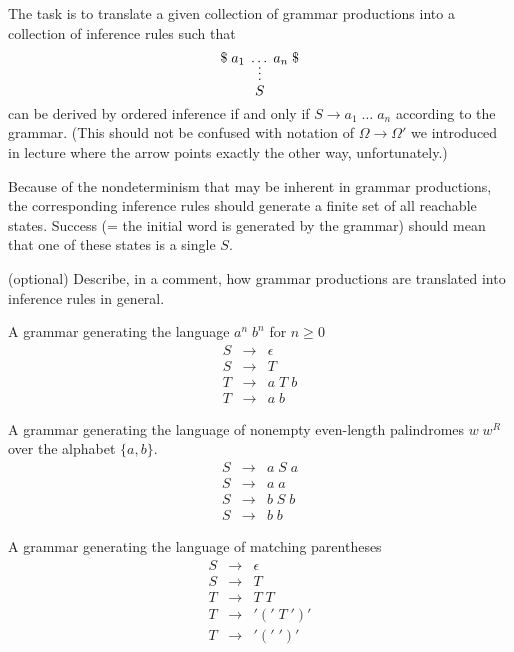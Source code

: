 \documentclass[11pt]{article}
\begin{document}
The task is to translate a given collection of grammar productions into
a collection of inference rules such that
\[
  \deduce[\ddd]{S}{\$\; a_1\; \ldots\; a_n\; \$}
\]
can be derived by ordered inference if and only if
$S \longrightarrow a_1\; \ldots\; a_n$ according to the grammar.
(This should not be confused with notation of $\Omega \longrightarrow \Omega'$
we introduced in lecture where the arrow points exactly the other way,
unfortunately.)

Because of the nondeterminism that may be inherent in grammar
productions, the corresponding inference rules should generate a finite
set of all reachable states.  Success (= the initial word is generated
by the grammar) should mean that one of these states is a single $S$.

\begin{task} (optional)
  Describe, in a comment, how grammar productions are translated into inference rules in
  general.
\end{task}

\begin{task}
  \label{task:anbn}
  A grammar generating the language $a^n\; b^n$ for $n \geq 0$
  \[
    \begin{array}{lcl}
      S & \rightarrow & \epsilon \\
      S & \rightarrow & T \\
      T & \rightarrow & a\; T\; b \\
      T & \rightarrow & a\; b
    \end{array}
  \]
\end{task}

\begin{task}
  \label{task:palindromes}
  A grammar generating the language of nonempty even-length palindromes
  $w\; w^R$ over the alphabet $\{a,b\}$.
  \[
    \begin{array}{lcl}
      S & \rightarrow & a\; S\; a \\
      S & \rightarrow & a\; a \\
      S & \rightarrow & b\; S\; b \\
      S & \rightarrow & b\; b
    \end{array}
  \]
\end{task}

\begin{task}
  \label{task:matching-parens}
  A grammar generating the language of matching parentheses 
  \[
    \begin{array}{lcl}
      S & \rightarrow & \epsilon \\
      S & \rightarrow & T \\
      T & \rightarrow & T\; T \\
      T & \rightarrow & '('\; T\; ')' \\
      T & \rightarrow & '('\; ')'
    \end{array}
  \]
\end{task}
\end{document}
